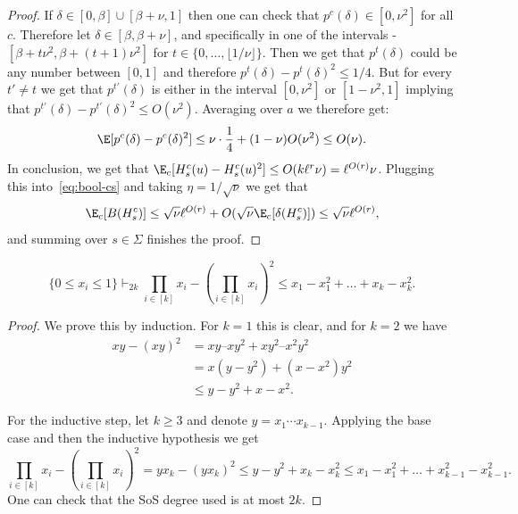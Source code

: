 \begin{proof}
If $\delta \in [0,\beta] \cup [\beta+\nu, 1]$ then one can check that $p^c(\delta) \in [0,\nu^2]$ for all $c$. Therefore let $\delta \in [\beta,\beta+\nu]$, and specifically in one of the intervals - $[\beta+t\nu^2, \beta+(t+1)\nu^2]$ for $t \in \{0,\ldots,\lfloor1/\nu\rfloor\}$. Then we get that $p^t(\delta)$ could be any number between $[0,1]$ and therefore $p^t(\delta)-p^t(\delta)^2 \leq 1/4$. But for every $t' \neq t$ we get that $p^{t'}(\delta)$ is either in the interval $[0,\nu^2]$ or $[1-\nu^2,1]$ implying that $p^{t'}(\delta) - p^{t'}(\delta)^2 \leq O(\nu^2)$. Averaging over $a$ we therefore get:
\[\E[p^c(\delta) - p^c(\delta)^2] \leq \nu \cdot \frac{1}{4}+ (1-\nu)O(\nu^2) \leq O(\nu).\]
In conclusion, we get that 
$\E_c[H_s^c(u) - H_s^c(u)^2]\leq O(k\ell^r\nu) = \ell^{O(r)}\nu$. Plugging this into~\eqref{eq:bool-cs} 
and taking $\eta = 1/\sqrt{\nu}$ we get that
\[\E_c[B(H^c_s)] \leq  \sqrt{\nu}\ell^{O(r)} + O(\sqrt{\nu}\E_c[\delta(H^c_s)]) \leq \sqrt{\nu}\ell^{O(r)},\]
and summing over $s \in \Sigma$ finishes the proof.
\end{proof}

\begin{claim}\label{claim:silly_sos}
\[
\{0 \leq x_i \leq 1\} \vdash_{2k} 
\prod_{i \in [k]}x_i - (\prod_{i \in [k]}x_i)^2 \leq x_1-x_1^2 + \ldots + x_k - x_k^2. 
\]
\end{claim}
\begin{proof}
We prove this by induction. For $k=1$ this is clear, and for $k=2$ we have
\begin{align*}
xy - (xy)^2 &= xy – xy^2 + xy^2 – x^2 y^2 \\
&= x(y-y^2)+ (x-x^2) y^2 \\
&\leq y-y^2 + x-x^2.    
\end{align*}

For the inductive step, let $k\geq 3$ and denote $y=x_1\cdots x_{k-1}$. Applying the base case and 
then the inductive hypothesis we get
\[\prod_{i \in [k]}x_i - \left(\prod_{i \in [k]}x_i\right)^2 
=y x_k - (y x_k)^2
\leq y-y^2 + x_k-x_k^2
\leq x_1 - x_1^2 + \ldots + x_{k-1}^2 - x_{k-1}^2.
\]
One can check that the SoS degree used is at most $2k$.
\end{proof}






